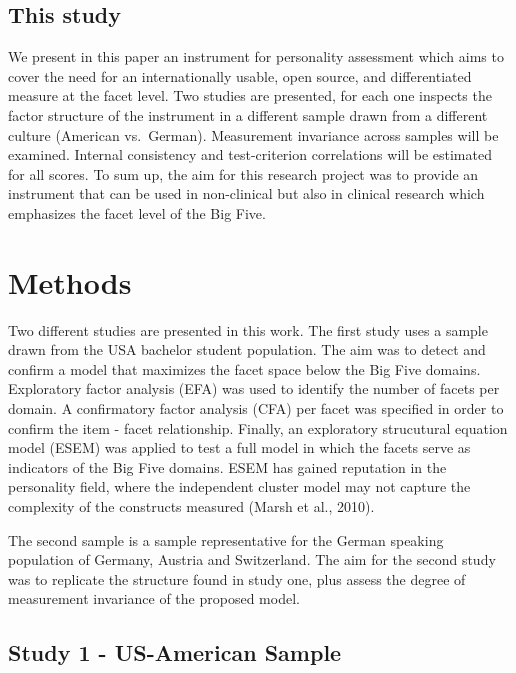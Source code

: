 \documentclass[,man,floatsintext]{apa6}
\theoremstyle{definition}
\theoremstyle{definition}
\theoremstyle{definition}
\theoremstyle{remark}
\begin{document}
\hypertarget{this-study}{%
\subsection{This study}\label{this-study}}

We present in this paper an instrument for personality assessment which
aims to cover the need for an internationally usable, open source, and
differentiated measure at the facet level. Two studies are presented,
for each one inspects the factor structure of the instrument in a
different sample drawn from a different culture (American vs.~German).
Measurement invariance across samples will be examined. Internal
consistency and test-criterion correlations will be estimated for all
scores. To sum up, the aim for this research project was to provide an
instrument that can be used in non-clinical but also in clinical
research which emphasizes the facet level of the Big Five.

\hypertarget{methods}{%
\section{Methods}\label{methods}}

Two different studies are presented in this work. The first study uses a
sample drawn from the USA bachelor student population. The aim was to
detect and confirm a model that maximizes the facet space below the Big
Five domains. Exploratory factor analysis (EFA) was used to identify the
number of facets per domain. A confirmatory factor analysis (CFA) per
facet was specified in order to confirm the item - facet relationship.
Finally, an exploratory strucutural equation model (ESEM) was applied to
test a full model in which the facets serve as indicators of the Big
Five domains. ESEM has gained reputation in the personality field, where
the independent cluster model may not capture the complexity of the
constructs measured (Marsh et al., 2010).

The second sample is a sample representative for the German speaking
population of Germany, Austria and Switzerland. The aim for the second
study was to replicate the structure found in study one, plus assess the
degree of measurement invariance of the proposed model.

\hypertarget{study-1---us-american-sample}{%
\subsection{Study 1 - US-American
Sample}\label{study-1---us-american-sample}}
\end{document}
